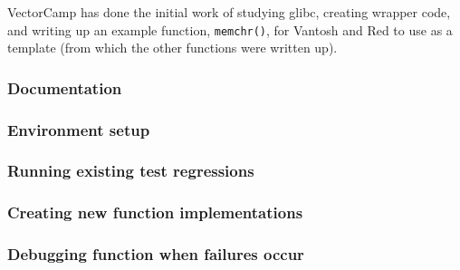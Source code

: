 VectorCamp has done the initial work of studying glibc,
creating wrapper code, and writing up an example function, \texttt{memchr()},
for Vantosh and Red to use as a template (from which the other functions were
written up).

\subsubsection{Documentation}

\subsubsection{Environment setup}

\subsubsection{Running existing test regressions}

\subsubsection{Creating new function implementations}

\subsubsection{Debugging function when failures occur}

